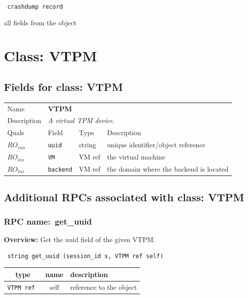 \vspace{0.3cm}

{\tt 
crashdump record
}


all fields from the object
\vspace{0.3cm}
\vspace{0.3cm}
\vspace{0.3cm}

\vspace{1cm}
\newpage
\section{Class: VTPM}
\subsection{Fields for class: VTPM}
\begin{longtable}{|lllp{}|}
\hline
\multicolumn{1}{|l}{Name} & \multicolumn{3}{l|}{\bf VTPM} \\
\multicolumn{1}{|l}{Description} & \multicolumn{3}{l|}{\parbox{11cm}{\em A
virtual TPM device.}} \\
\hline
Quals & Field & Type & Description \\
\hline
$\mathit{RO}_\mathit{run}$ &  {\tt uuid} & string & unique identifier/object reference \\
$\mathit{RO}_\mathit{ins}$ &  {\tt VM} & VM ref & the virtual machine \\
$\mathit{RO}_\mathit{ins}$ &  {\tt backend} & VM ref & the domain where the backend is located \\
\hline
\end{longtable}
\subsection{Additional RPCs associated with class: VTPM}
\subsubsection{RPC name:~get\_uuid}

{\bf Overview:} 
Get the uuid field of the given VTPM.

\begin{verbatim} string get_uuid (session_id s, VTPM ref self)\end{verbatim}



 
\vspace{0.3cm}
\begin{tabular}{|c|c|p{7cm}|}
 \hline
{\bf type} & {\bf name} & {\bf description} \\ \hline
{\tt VTPM ref } & self & reference to the object \\ \hline 

\end{tabular}

